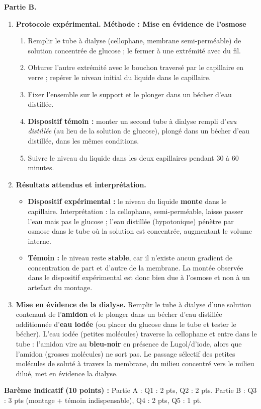 \documentclass[11pt]{article}
\newcommand{\cle}[1]{{\popxbold\color{popdark}#1}}
\begin{document}
\begin{corrige}
\textbf{Partie B.}
\begin{enumerate}
\item[3.] \textbf{Protocole expérimental.}
\textbf{Méthode : Mise en évidence de l'osmose}
\begin{enumerate}
\item Remplir le tube à dialyse (cellophane, membrane semi-perméable) de solution concentrée de glucose ; le fermer à une extrémité avec du fil.
\item Obturer l'autre extrémité avec le bouchon traversé par le capillaire en verre ; repérer le niveau initial du liquide dans le capillaire.
\item Fixer l'ensemble sur le support et le plonger dans un bécher d'eau distillée.
\item \textbf{Dispositif témoin :} monter un second tube à dialyse rempli d'\emph{eau distillée} (au lieu de la solution de glucose), plongé dans un bécher d'eau distillée, dans les mêmes conditions.
\item Suivre le niveau du liquide dans les deux capillaires pendant 30 à 60 minutes.
\end{enumerate}
\item[4.] \textbf{Résultats attendus et interprétation.}
\begin{itemize}
\item \textbf{Dispositif expérimental :} le niveau du liquide \textbf{monte} dans le capillaire. Interprétation : la cellophane, semi-perméable, laisse passer l'eau mais pas le glucose ; l'eau distillée (hypotonique) pénètre par \cle{osmose} dans le tube où la solution est concentrée, augmentant le volume interne.
\item \textbf{Témoin :} le niveau reste \textbf{stable}, car il n'existe aucun gradient de concentration de part et d'autre de la membrane. La montée observée dans le dispositif expérimental est donc bien due à l'osmose et non à un artefact du montage.
\end{itemize}
\item[5.] \textbf{Mise en évidence de la dialyse.} Remplir le tube à dialyse d'une solution contenant de l'\textbf{amidon} et le plonger dans un bécher d'eau distillée additionnée d'\textbf{eau iodée} (ou placer du glucose dans le tube et tester le bécher). L'eau iodée (petites molécules) traverse la cellophane et entre dans le tube : l'amidon vire au \textbf{bleu-noir} en présence de Lugol/d'iode, alors que l'amidon (grosses molécules) ne sort pas. Le passage sélectif des petites molécules de soluté à travers la membrane, du milieu concentré vers le milieu dilué, met en évidence la \cle{dialyse}.
\end{enumerate}
\textbf{Barème indicatif (10 points) :} Partie A : Q1 : 2 pts, Q2 : 2 pts. Partie B : Q3 : 3 pts (montage + témoin indispensable), Q4 : 2 pts, Q5 : 1 pt.
\end{corrige}
\end{document}
